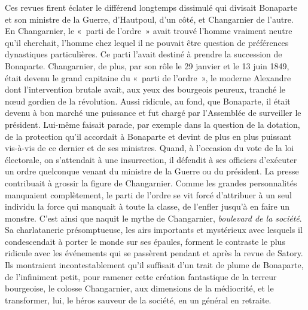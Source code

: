 \documentclass[twoside]{book} %
\begin{document}
Ces revues firent éclater le différend longtemps dissimulé qui divisait Bonaparte et son ministre de la Guerre, d’Hautpoul, d’un côté, et Changarnier de l’autre. En Changarnier, le « parti de l’ordre » avait trouvé l’homme vraiment neutre qu’il cherchait, l’homme chez lequel il ne pouvait être question de préférences dynastiques particulières. Ce parti l’avait destiné à prendre la succession de Bonaparte. Changarnier, de plus, par son rôle le 29 janvier et le 13 juin 1849, était devenu le grand capitaine du « parti de l’ordre », le moderne Alexandre dont l’intervention brutale avait, aux yeux des bourgeois peureux, tranché le nœud gordien de la révolution. Aussi ridicule, au fond, que Bonaparte, il était devenu à bon marché une puissance et fut chargé par l’Assemblée de surveiller le président. Lui-même faisait parade, par exemple dans la question de la dotation, de la protection qu’il accordait à Bonaparte et devint de plus en plus puissant vis-à-vis de ce dernier et de ses ministres. Quand, à l’occasion du vote de la loi électorale, on s’attendait à une insurrection, il défendit à ses officiers d’exécuter un ordre quelconque venant du ministre de la Guerre ou du président. La presse contribuait à grossir la figure de Changarnier. Comme les grandes personnalités manquaient complètement, le parti de l’ordre se vit forcé d’attribuer à un seul individu la force qui manquait à toute la classe, de l’enfler jusqu’à en faire un monstre. C’est ainsi que naquit le mythe de Changarnier, \emph{boulevard de la société}. Sa charlatanerie présomptueuse, les airs importants et mystérieux avec lesquels il condescendait à porter le monde sur ses épaules, forment le contraste le plus ridicule avec les événements qui se passèrent pendant et après la revue de Satory. Ils montraient incontestablement qu’il suffisait d’un trait de plume de Bonaparte, de l’infiniment petit, pour ramener cette création fantastique de la terreur bourgeoise, le colosse Changarnier, aux dimensions de la médiocrité, et le transformer, lui, le héros sauveur de la société, en un général en retraite.\par
\end{document}
